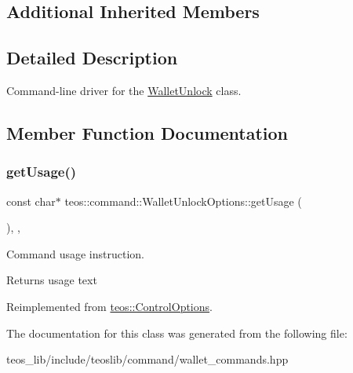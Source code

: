 \subsection*{Additional Inherited Members}


\subsection{Detailed Description}
Command-\/line driver for the \mbox{\hyperlink{classteos_1_1command_1_1_wallet_unlock}{Wallet\+Unlock}} class. 

\subsection{Member Function Documentation}
\mbox{\label{classteos_1_1command_1_1_wallet_unlock_options_aa630c4deec62ef8d44cb37c03573c071}} 
\subsubsection{\texorpdfstring{get\+Usage()}{getUsage()}}
{\footnotesize\ttfamily const char$\ast$ teos\+::command\+::\+Wallet\+Unlock\+Options\+::get\+Usage (\begin{DoxyParamCaption}{ }\end{DoxyParamCaption})\hspace{0.3cm}{\ttfamily [inline]}, {\ttfamily [protected]}, {\ttfamily [virtual]}}



Command \textquotesingle{}usage\textquotesingle{} instruction. 

\begin{DoxyReturn}{Returns}
usage text 
\end{DoxyReturn}


Reimplemented from \mbox{\hyperlink{classteos_1_1_control_options_a0aa5671f9bc750ed5280c26c543874f3}{teos\+::\+Control\+Options}}.



The documentation for this class was generated from the following file\+:\begin{DoxyCompactItemize}
\item 
teos\+\_\+lib/include/teoslib/command/wallet\+\_\+commands.\+hpp\end{DoxyCompactItemize}

